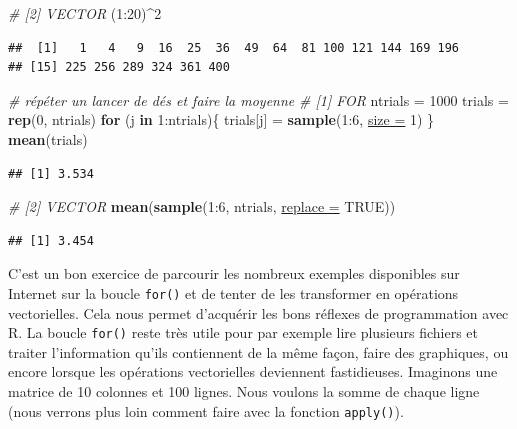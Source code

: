 \documentclass[twoside,symmetric]{book}
\newenvironment{Shaded}{}{}
\newcommand{\CommentTok}[1]{\textit{#1}}
\newcommand{\ControlFlowTok}[1]{\textbf{#1}}
\newcommand{\DataTypeTok}[1]{\underline{#1}}
\newcommand{\DecValTok}[1]{#1}
\newcommand{\KeywordTok}[1]{\textbf{#1}}
\newcommand{\NormalTok}[1]{#1}
\newcommand{\OperatorTok}[1]{#1}
\newcommand{\OtherTok}[1]{#1}
\newcommand{\StringTok}[1]{#1}
\begin{document}
\begin{Shaded}
\begin{Highlighting}[]
\CommentTok{# [2] VECTOR}
\NormalTok{(}\DecValTok{1}\OperatorTok{:}\DecValTok{20}\NormalTok{)}\OperatorTok{^}\DecValTok{2}
\end{Highlighting}
\end{Shaded}

\begin{verbatim}
##  [1]   1   4   9  16  25  36  49  64  81 100 121 144 169 196
## [15] 225 256 289 324 361 400
\end{verbatim}

\begin{Shaded}
\begin{Highlighting}[]
\CommentTok{# répéter un lancer de dés et faire la moyenne}
\CommentTok{# [1] FOR}
\NormalTok{ntrials =}\StringTok{ }\DecValTok{1000}
\NormalTok{trials =}\StringTok{ }\KeywordTok{rep}\NormalTok{(}\DecValTok{0}\NormalTok{, ntrials)}
\ControlFlowTok{for}\NormalTok{ (j }\ControlFlowTok{in} \DecValTok{1}\OperatorTok{:}\NormalTok{ntrials)\{}
\NormalTok{  trials[j] =}\StringTok{ }\KeywordTok{sample}\NormalTok{(}\DecValTok{1}\OperatorTok{:}\DecValTok{6}\NormalTok{, }\DataTypeTok{size =} \DecValTok{1}\NormalTok{)}
\NormalTok{\}}
\KeywordTok{mean}\NormalTok{(trials)}
\end{Highlighting}
\end{Shaded}

\begin{verbatim}
## [1] 3.534
\end{verbatim}

\begin{Shaded}
\begin{Highlighting}[]
\CommentTok{# [2] VECTOR}
\KeywordTok{mean}\NormalTok{(}\KeywordTok{sample}\NormalTok{(}\DecValTok{1}\OperatorTok{:}\DecValTok{6}\NormalTok{, ntrials, }\DataTypeTok{replace =} \OtherTok{TRUE}\NormalTok{))}
\end{Highlighting}
\end{Shaded}

\begin{verbatim}
## [1] 3.454
\end{verbatim}

C'est un bon exercice de parcourir les nombreux exemples disponibles sur Internet sur la boucle \texttt{for()} et de tenter de les transformer en opérations vectorielles. Cela nous permet d'acquérir les bons réflexes de programmation avec R. La boucle \texttt{for()} reste très utile pour par exemple lire plusieurs fichiers et traiter l'information qu'ils contiennent de la même façon, faire des graphiques, ou encore lorsque les opérations vectorielles deviennent fastidieuses. Imaginons une matrice de 10 colonnes et 100 lignes. Nous voulons la somme de chaque ligne (nous verrons plus loin comment faire avec la fonction \texttt{apply()}).
\end{document}
